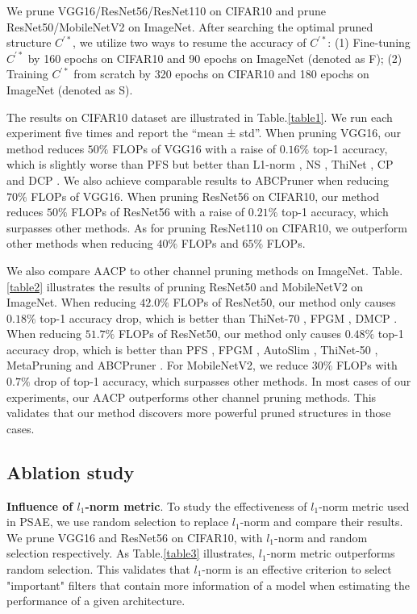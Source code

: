 \documentclass[final]{cvpr}
\begin{document}
We prune VGG16/ResNet56/ResNet110 on CIFAR10 and prune ResNet50/MobileNetV2 on ImageNet.
After searching the optimal pruned structure $C^{'*}$, we utilize two ways to resume the accuracy of 
$C^{'*}$: (1) Fine-tuning $C^{'*}$ by 160 epochs on CIFAR10 and 90 epochs on ImageNet (denoted as F); (2) Training $C^{'*}$
from scratch by 320 epochs on CIFAR10 and 180 epochs on ImageNet (denoted as S). 

The results on CIFAR10 dataset are illustrated in Table.\ref{table1}. We run each experiment five times and report the “mean
± std”. When pruning VGG16, our method reduces $50\%$ FLOPs 
of VGG16 with a raise of $0.16\%$ top-1 accuracy, which is slightly worse than PFS \cite{wang2019pruning} 
but better than L1-norm \cite{li2016pruning}, NS \cite{liu2017learning}, ThiNet \cite{luo2017thinet}, CP \cite{he2017channel} 
and DCP \cite{zhuang2018discrimination}. We also achieve comparable results to ABCPruner \cite{lin2020channel} when reducing $70\%$ FLOPs of VGG16. 
When pruning ResNet56 on CIFAR10, our method reduces $50\%$ FLOPs of ResNet56 with 
a raise of $0.21\%$ top-1 accuracy, which surpasses other methods. As for pruning ResNet110 on CIFAR10, 
we outperform other methods when reducing $40\%$ FLOPs and $65\%$ FLOPs.

We also compare AACP to other channel pruning methods on ImageNet. Table.\ref{table2} illustrates the results of pruning ResNet50
and MobileNetV2 on ImageNet. When reducing $42.0\%$ FLOPs of ResNet50, our method only causes $0.18\%$ top-1 accuracy drop, 
which is better than ThiNet-70 \cite{luo2017thinet}, FPGM \cite{he2019filter}, DMCP \cite{guo2020dmcp}. When reducing $51.7\%$ FLOPs of ResNet50, 
our method only causes $0.48\%$ top-1 accuracy drop, 
which is better than PFS \cite{wang2019pruning}, FPGM \cite{he2019filter}, AutoSlim \cite{yu2019autoslim}, ThiNet-50 \cite{luo2017thinet}, 
MetaPruning \cite{liu2019metapruning} and ABCPruner \cite{lin2020channel}. For MobileNetV2, we reduce $30\%$ FLOPs with $0.7\%$ drop 
of top-1 accuracy, which surpasses other methods. In most cases of our experiments, our AACP outperforms other channel pruning methods.
This validates that our method discovers more powerful pruned structures in those cases.


\subsection{Ablation study}

\textbf{Influence of $l_1$-norm metric}. To study the effectiveness of $l_1$-norm metric used in PSAE, 
we use random selection to replace $l_1$-norm and compare their results. 
We prune VGG16 and ResNet56 on CIFAR10, with $l_1$-norm and random selection respectively.
As Table.\ref{table3} illustrates, $l_1$-norm metric outperforms random selection. This validates that $l_1$-norm is an 
effective criterion to select "important" filters that contain more information of a model when estimating the performance
of a given architecture.
\end{document}
